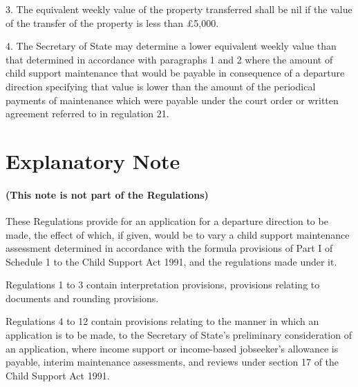\documentclass[12pt,a4paper]{article}
\begin{document}
\medskip

3.
The equivalent weekly value of the property transferred shall be nil if the
value of the transfer of the property is less than £5,000.

\medskip

4. The Secretary of State may determine a lower equivalent weekly value than that determined in accordance with paragraphs 1 and 2 where the amount of child support maintenance that would be payable in consequence of a departure direction specifying that value is lower than the amount of 
the periodical payments of maintenance which were  %
payable under the court order or written agreement referred to in regulation 21.


%



\part{Explanatory Note}

\renewcommand\parthead{--- Explanatory Note}

\subsection*{(This note is not part of the Regulations)}

These Regulations provide for an application for a departure direction to be
made, the effect of which, if given, would be to vary a child support
maintenance assessment determined in accordance with the formula provisions of
Part I of Schedule 1 to the Child Support Act 1991, and the regulations made
under it.

Regulations 1 to 3 contain interpretation provisions, provisions relating to
documents and rounding provisions.

Regulations 4 to 12 contain provisions relating to the manner in which an
application is to be made, to the Secretary of State’s preliminary consideration
of an application, where income support or income-based jobseeker’s allowance is
payable, interim maintenance assessments, and reviews under section 17 of the
Child Support Act 1991.
\end{document}
